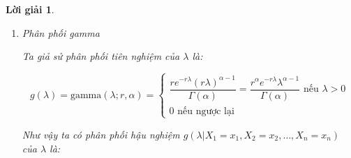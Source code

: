 \documentclass[14pt, a4paper]{article}
\theoremstyle{sltheorem}
\theoremstyle{soltheorem}
\newtheorem*{loigiai}{Lời giải}
\begin{document}
\begin{loigiai}
\begin{enumerate}
\begin{enumerate}[label=(\alph*)]
            \item Phân phối gamma
            
            Ta giả sử phân phối tiên nghiệm của $\lambda$ là:

            \begin{equation*}
                g(\lambda) = \text{gamma}(\lambda; r, \alpha) = \begin{cases}
                    \dfrac{r e^{-r\lambda} (r\lambda)^{\alpha - 1}}{\Gamma(\alpha)}=\dfrac{r^{\alpha}e^{-r\lambda} \lambda^{\alpha - 1}}{\Gamma(\alpha)} \text{ nếu } \lambda > 0 \\
                    0 \text{ nếu ngược lại}
                \end{cases}
            \end{equation*}

            Như vậy ta có phân phối hậu nghiệm $g(\lambda \vert X_1 =x_1, X_2=x_2, \dots, X_n=x_n)$ của $\lambda$ là:


\end{enumerate}
\end{enumerate}
\end{loigiai}
\end{document}
